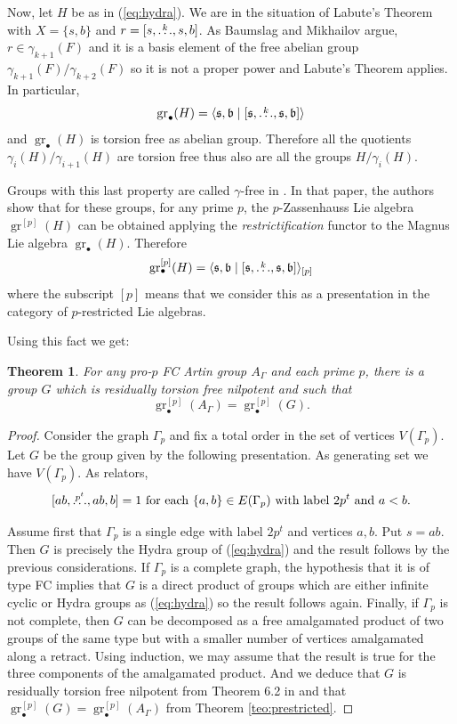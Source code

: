 \documentclass[10pt, oneside]{amsart}
\newcommand{\N}{\mathbb{N}} %
\newcommand{\gr}{\operatorname{gr}} %
\newtheorem{theorem}{Theorem}[section]
\theoremstyle{definition}
\theoremstyle{remark}
\theoremstyle{plain}
\begin{document}
Now, let $H$ be as in (\ref{eq:hydra}). We are in the situation of Labute's Theorem with $X=\{s,b\}$ and $r=[s,\buildrel k\over\ldots,s,b]$.
As Baumslag and Mikhailov argue, $r\in\gamma_{k+1}(F)$ and it is a basis element of the free abelian group $\gamma_{k+1}(F)/\gamma_{k+2}(F)$ so it is not a proper power and Labute's Theorem applies. In particular, 
$$\gr_\bullet(H)=\langle \mathfrak{s},\mathfrak{b}\mid[\mathfrak{s},\buildrel k\over\ldots,\mathfrak{s},\mathfrak{b}]\rangle$$
and $\gr_\bullet(H)$ is torsion free as abelian group. Therefore all the quotients $\gamma_i(H)/\gamma_{i+1}(H)$ are torsion free thus also are all the groups $H/\gamma_i(H)$.

Groups with this last property are called $\gamma$-free in \cite{MRW}. In that paper, the authors show that for these groups, for any prime $p$, the $p$-Zassenhauss Lie algebra $\gr^{[p]}(H)$ can be obtained applying the {\sl restrictification} functor to the Magnus Lie algebra $\gr_\bullet(H)$. Therefore
$$\gr^{[p]}_\bullet(H)=\langle \mathfrak{s},\mathfrak{b}\mid[\mathfrak{s},\buildrel k\over\ldots,\mathfrak{s},\mathfrak{b}]\rangle_{[p]}$$
where the subscript $[p]$ means that we consider this as a presentation in the category of $p$-restricted Lie algebras.

Using this fact we get:


\begin{theorem}\label{teo:Hydra}
    For any pro-$p$ FC Artin group $A_\Gamma$ and each prime $p$, there is a group $G$ which is residually torsion free nilpotent and such that
$$\gr_\bullet^{[p]}(A_\Gamma)=\gr_\bullet^{[p]}(G).$$
\end{theorem}
\begin{proof} Consider the graph $\Gamma_p$  and fix a total order in the set of vertices $V(\Gamma_p)$. Let $G$ be the group given by the following presentation. As generating set we have $V(\Gamma_p)$. As relators,
$$[ab,\buildrel{p^t}\over\ldots,ab,b]=1\text{ for each  $\{a,b\}\in E(\Gamma_p)$ with label $2p^t$ and $a<b$}.$$

Assume first that $\Gamma_p$ is a single edge with label $2p^t$ and vertices $a,b$. Put $s=ab$. Then $G$ is precisely the Hydra group of (\ref{eq:hydra}) and the result follows by the previous considerations. If $\Gamma_p$ is a complete graph,
the hypothesis that it is of type FC implies that $G$ is a direct product of groups which are either infinite cyclic or Hydra groups as (\ref{eq:hydra}) so the result follows again. Finally, if $\Gamma_p$ is not complete, then $G$ can be decomposed as a free amalgamated product of two groups of the same type but with a smaller number of vertices amalgamated along a retract. Using induction, we may assume that the result is true for the three components of the amalgamated product. And we deduce that $G$ is residually torsion free nilpotent from Theorem 6.2 in \cite{LMPW} and that $\gr_\bullet^{[p]}(G)=\gr_\bullet^{[p]}(A_\Gamma)$ from Theorem \ref{teo:prestricted}.
\end{proof} 
\end{document}

